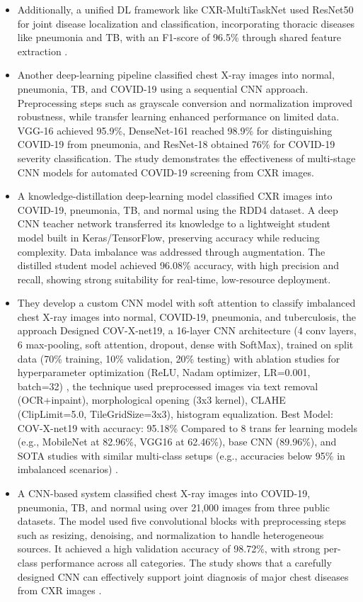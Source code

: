 \begin{itemize}
	\item Additionally, a unified DL framework like CXR-MultiTaskNet used ResNet50 for joint disease localization and classification, incorporating thoracic diseases like pneumonia and TB, with an F1-score of 96.5\% through shared feature extraction \cite{ref13}.
	\item Another deep-learning pipeline classified chest X-ray images into normal, pneumonia, TB, and COVID-19 using a sequential CNN approach. Preprocessing steps such as grayscale conversion and normalization improved robustness, while transfer learning enhanced performance on limited data. VGG-16 achieved 95.9\%, DenseNet-161 reached 98.9\% for distinguishing COVID-19 from pneumonia, and ResNet-18 obtained 76\% for COVID-19 severity classification. The study demonstrates the effectiveness of multi-stage CNN models for automated COVID-19 screening from CXR images\cite{ref14}.
	\item A knowledge-distillation deep-learning model classified CXR images into COVID-19, pneumonia, TB, and normal using the RDD4 dataset. A deep CNN teacher network transferred its knowledge to a lightweight student model built in Keras/TensorFlow, preserving accuracy while reducing complexity. Data imbalance was addressed through augmentation. The distilled student model achieved 96.08\% accuracy, with high precision and recall, showing strong suitability for real-time, low-resource deployment\cite{ref15}.
	\item They develop a custom CNN model with soft attention to classify imbalanced chest X-ray images into normal, COVID-19, pneumonia, and tuberculosis, 
	the approach Designed COV-X-net19, a 16-layer CNN architecture (4 conv layers, 6 max-pooling, soft attention, dropout, dense with SoftMax), trained on split data (70\% training, 10\% validation, 20\% testing) with ablation studies for hyperparameter optimization (ReLU, Nadam optimizer, LR=0.001, batch=32) , the technique used preprocessed images via text removal (OCR+inpaint), morphological opening (3x3 kernel), CLAHE (ClipLimit=5.0, TileGridSize=3x3), histogram equalization. Best Model: COV-X-net19 with accuracy: 95.18\% Compared to 8 trans fer learning models (e.g., MobileNet at 82.96\%, VGG16 at 62.46\%), base CNN (89.96\%), and SOTA studies with similar multi-class setups (e.g., accuracies below 95\% in imbalanced scenarios) \cite{ref16}.
	\item A CNN-based system classified chest X-ray images into COVID-19, pneumonia, TB, and normal using over 21,000 images from three public datasets. The model used five convolutional blocks with preprocessing steps such as resizing, denoising, and normalization to handle heterogeneous sources. It achieved a high validation accuracy of 98.72\%, with strong per-class performance across all categories. The study shows that a carefully designed CNN can effectively support joint diagnosis of major chest diseases from CXR images \cite{ref17}.
	
\end{itemize}

